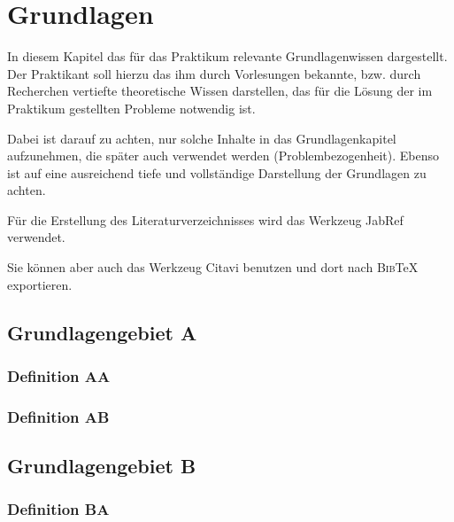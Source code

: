 \documentclass[oneside]{ausarbeitung}
\begin{document}
\chapter{Grundlagen}
\label{cha:grundlagen}

In diesem Kapitel das für das Praktikum relevante Grundlagenwissen
dargestellt. Der Praktikant soll hierzu das ihm durch Vorlesungen
bekannte, bzw. durch Recherchen vertiefte theoretische Wissen
darstellen, das für die Lösung der im Praktikum gestellten Probleme
notwendig ist.

Dabei ist darauf zu achten, nur solche Inhalte in das Grundlagenkapitel
aufzunehmen, die später auch verwendet werden (Problembezogenheit).
Ebenso ist auf eine ausreichend tiefe und vollständige Darstellung der
Grundlagen zu achten.

Für die Erstellung des Literaturverzeichnisses
wird das Werkzeug JabRef\autocite{JabRef:JabRef} verwendet.

Sie können aber auch das Werkzeug Citavi\autocite{SAS:Citavi} benutzen
und dort nach \textsc{Bib}\TeX{} exportieren.

\section{Grundlagengebiet A}
\label{sec:grundlagengebieta}

\blindtext

\subsection{Definition AA}
\label{sub:definitionaa}

\blindtext

\subsection{Definition AB}
\label{sub:definitionab}

\blindtext

\section{Grundlagengebiet B}
\label{sec:grundlagengebietb}

\blindtext

\subsection{Definition BA}
\label{sub:definitionBa}
\end{document}
